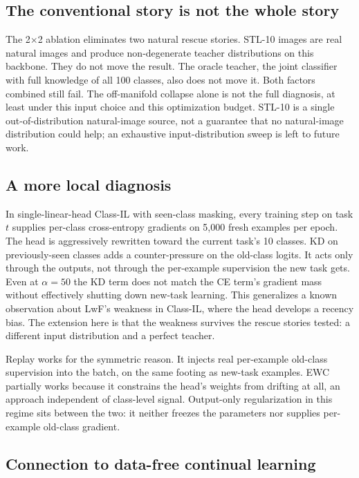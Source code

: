 \documentclass[conference]{IEEEtran}
\begin{document}
\subsection{The conventional story is not the whole story}

The 2$\times$2 ablation eliminates two natural rescue stories. STL-10
images are real natural images and produce non-degenerate teacher
distributions on this backbone. They do not move the result. The oracle
teacher, the joint classifier with full knowledge of all 100 classes,
also does not move it. Both factors combined still fail. The off-manifold
collapse alone is not the full diagnosis, at least under this input
choice and this optimization budget. STL-10 is a single out-of-distribution
natural-image source, not a guarantee that no natural-image distribution
could help; an exhaustive input-distribution sweep is left to future
work.

\subsection{A more local diagnosis}

In single-linear-head Class-IL with seen-class masking, every training step
on task $t$ supplies per-class cross-entropy gradients on 5{,}000 fresh
examples per epoch. The head is aggressively rewritten toward the current
task's 10 classes. KD on previously-seen classes adds a counter-pressure
on the old-class logits. It acts only through the outputs, not through the
per-example supervision the new task gets. Even at $\alpha = 50$ the KD
term does not match the CE term's gradient mass without effectively
shutting down new-task learning. This generalizes a known observation
about LwF's weakness in Class-IL, where the head develops a recency bias.
The extension here is that the weakness survives the rescue stories
tested: a different input distribution and a perfect teacher.

Replay works for the symmetric reason. It injects real per-example
old-class supervision into the batch, on the same footing as new-task
examples. EWC partially works because it constrains the head's weights
from drifting at all, an approach independent of class-level signal.
Output-only regularization in this regime sits between the two: it
neither freezes the parameters nor supplies per-example old-class
gradient.

\subsection{Connection to data-free continual learning}
\end{document}
